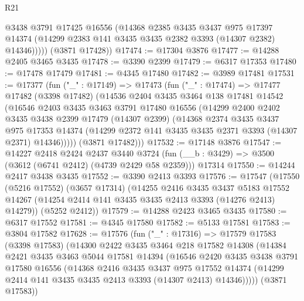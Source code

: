 \begin{lexlean}{R21}
\begin{coremodule}
            @3438
            @3791
            @17425
            @16556
            (@14368
              @2385
              @3435
              @3437
              @975
              @17397
              @14374
              (@14299 @2383 @141 @3435 @3435 @2382 @3393 (@14307 @2382) @14346)))))
      (@3871 @17428))
@17474 := @17304 @3876
@17477 := @14288 @2405 @3465 @3435
@17478 := @3390 @2399
@17479 := @6317 @17353
@17480 := @17478 @17479
@17481 := @4345 @17480
@17482 := @3989 @17481
@17531 := @17377
    (fun ("_" : @17149) =>
    @17473
      (fun ("_" : @17474) =>
      @17477
        @17482
        (@3398 @17482)
        (@14536
          @2404
          @3435
          @3464
          @138
          @17481
          @14542
          (@16546
            @2403
            @3435
            @3463
            @3791
            @17480
            @16556
            (@14299
              @2400
              @2402
              @3435
              @3438
              @2399
              @17479
              (@14307 @2399)
              (@14368
                @2374
                @3435
                @3437
                @975
                @17353
                @14374
                (@14299 @2372 @141 @3435 @3435 @2371 @3393 (@14307 @2371) @14346)))))
        (@3871 @17482)))
@17532 := @17148 @3876
@17547 := @14227
    @2418
    @2424
    @2437
    @3440
    @3724
    (fun (__b : @3429) => @3500 (@3612 (@6741 @2412) (@4739 @2429 @58 @2359)))
    @17314
@17550 := @14244 @2417 @3438 @3435
@17552 := @3390 @2413 @3393
@17576 := @17547
    (@17550
      (@5216 @17552)
      (@3657 @17314)
      (@14255
        @2416
        @3435
        @3437
        @5183
        @17552
        @14267
        (@14254 @2414 @141 @3435 @3435 @2413 @3393 (@14276 @2413) @14279))
      (@5252 @2412))
@17579 := @14288 @2423 @3465 @3435
@17580 := @6317 @17552
@17581 := @4345 @17580
@17582 := @5133 @17581
@17583 := @3804 @17582
@17628 := @17576
    (fun ("_" : @17316) =>
    @17579
      @17583
      (@3398 @17583)
      (@14300
        @2422
        @3435
        @3464
        @218
        @17582
        @14308
        (@14384
          @2421
          @3435
          @3463
          @5044
          @17581
          @14394
          (@16546
            @2420
            @3435
            @3438
            @3791
            @17580
            @16556
            (@14368
              @2416
              @3435
              @3437
              @975
              @17552
              @14374
              (@14299 @2414 @141 @3435 @3435 @2413 @3393 (@14307 @2413) @14346)))))
      (@3871 @17583))

\end{coremodule}
\end{lexlean}
